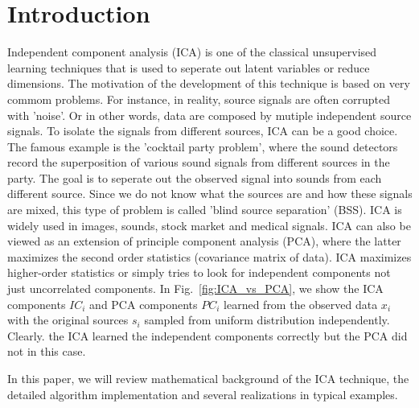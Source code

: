 \documentclass[aps,prl,preprint,superscriptaddress]{revtex4-2}
\begin{document}
\section{Introduction}
Independent component analysis (ICA) is one of the classical unsupervised learning techniques that is used to seperate out latent variables or reduce dimensions. The motivation of the development of this technique is based on very commom problems. For instance, in reality, source signals are often corrupted with 'noise'. Or in other words, data are composed by mutiple independent source signals. To isolate the signals from different sources, ICA can be a good choice. The famous example is the 'cocktail party problem', where the sound detectors record the superposition of various sound signals from different sources in the party. The goal is to seperate out the observed signal into sounds from each different source. Since we do not know what the sources are and how these signals are mixed, this type of problem is called 'blind source separation' (BSS). ICA is widely used in images, sounds, stock market and medical signals. ICA can also be viewed as an extension of principle component analysis (PCA), where the latter maximizes the second order statistics (covariance matrix of data). ICA maximizes higher-order statistics or simply tries to look for independent components not just uncorrelated components. In Fig.~\ref{fig:ICA_vs_PCA}, we show the ICA components $IC_{i}$ and PCA components $PC_{i}$ learned from the observed data $x_{i}$ with the original sources $s_{i}$ sampled from uniform distribution independently. Clearly. the ICA learned the independent components correctly but the PCA did not in this case. 

In this paper, we will review mathematical background of the ICA technique, the detailed algorithm implementation and several realizations in typical examples. 
\end{document}
